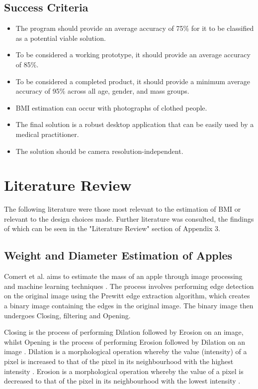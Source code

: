 \documentclass[conference]{IEEEtran}
\begin{document}
\subsection{Success Criteria}
\begin{itemize}
	\item The program should provide an average accuracy of 75\% for it to be classified as a potential viable solution.
	\item To be considered a working prototype, it should provide an average accuracy of 85\%.
	\item To be considered a completed product, it should provide a minimum average accuracy of 95\% across all age, gender, and mass groups.
	\item BMI estimation can occur with photographs of clothed people.
	\item The final solution is a robust desktop application that can be easily used by a medical practitioner.
	\item The solution should be camera resolution-independent.
\end{itemize}

\section{Literature Review}
The following literature were those most relevant to the estimation of BMI or relevant to the design choices made.
Further literature was consulted, the findings of which can be seen in the "Literature Review" section of Appendix 3.
\subsection{Weight and Diameter Estimation of Apples}
Comert et al. aims to estimate the mass of an apple through image processing and machine learning techniques \cite{comert}.
The process involves performing edge detection on the original image using the Prewitt edge extraction algorithm, which creates a binary image containing the edges in the original image.
The binary image then undergoes Closing, filtering and Opening.

Closing is the process of performing Dilation followed by Erosion on an image, whilst Opening is the process of performing Erosion followed by Dilation on an image \cite{opening,closing}.
Dilation is a morphological operation whereby the value (intensity) of a pixel is increased to that of the pixel in its neighbourhood with the highest intensity \cite{mathworksdilationerosion}.
Erosion is a morphological operation whereby the value of a pixel is decreased to that of the pixel in its neighbourhood with the lowest intensity \cite{mathworksdilationerosion}.
\end{document}

